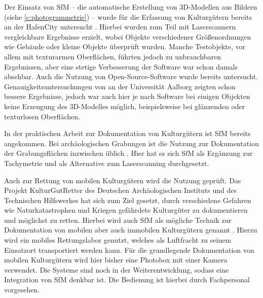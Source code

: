 \documentclass[./00PhotoBox]{subfiles}
\begin{document}
Der Einsatz von \acrfull{SfM} -- die au\-to\-ma\-tische Erstellung von 3D-Modellen aus Bildern (siehe \autoref{c:photogrammetrie}) -- wurde für die Erfassung von Kulturgütern bereits \citeyear{kersten2012} an der HafenCity untersucht \citep[vgl.][]{kersten2012}. Hierbei wurden zum Teil mit Laserscannern vergleichbare Ergebnisse erzielt, wobei Objekte verschiedener Größenordnungen wie Gebäude oder kleine Objekte überprüft wurden. Manche Testobjekte, vor allem mit texturarmen Oberflächen, führten jedoch zu unbrauchbaren Ergebnissen, aber eine stetige Verbesserung der Software war schon damals absehbar. Auch die Nutzung von Open-Source-Software wurde bereits untersucht. Genauigkeitsuntersuchungen von \citet{IvanNikolov} an der Universität Aalborg zeigten schon bessere Ergebnisse, jedoch war auch hier je nach Software bei einigen Objekten keine Erzeugung des 3D-Modelles möglich, beispielsweise bei glänzenden oder texturlosen Oberflächen.

In der praktischen Arbeit zur Dokumentation von Kulturgütern ist \acrfull{SfM} bereits angekommen. Bei archäologischen Grabungen ist die Nutzung zur Dokumentation der Grabungsflächen inzwischen üblich \citep[vgl.][]{grabungen_sfm}. Hier hat es sich \Gls{SfM} als Ergänzung zur Tachymetrie und als Alternative zum Laserscanning durchgesetzt.

Auch zur Rettung von mobilen Kulturgütern wird die Nutzung geprüft. Das Projekt KulturGutRetter des Deutschen Archäologischen Instituts und des Technischen Hilfswerkes hat sich zum Ziel gesetzt, durch verschiedene Gefahren wie Naturkatastrophen und Kriegen gefährdete Kulturgüter zu dokumentieren und möglichst zu retten. Hierbei wird auch \Gls{SfM} als mögliche Technik zur Dokumentation von mobilen aber auch immobilen Kulturgütern genannt \citep[vgl.][S. 48]{kgr_article}. Hierzu wird ein mobiles Rettungslabor genutzt, welches als Luftfracht zu seinem Einsatzort transportiert werden kann. Für die grundlegende Dokumentation von mobilen Kulturgütern wird hier bisher eine Photobox mit einer Kamera verwendet. Die Systeme sind noch in der Weiterentwicklung, sodass eine Integration von \Gls{SfM} denkbar ist. Die Bedienung ist hierbei durch Fachpersonal vorgesehen. \citep[vgl.][]{kulturgutretter}

\biblio
\end{document}

